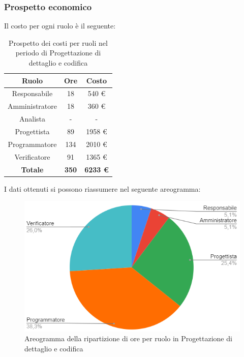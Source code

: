 \subsubsection{Prospetto economico}
Il costo per ogni ruolo è il seguente:
\begin{table}[H]
		\begin{center}
			\setlength{\aboverulesep}{0pt}
			\setlength{\belowrulesep}{0pt}
			\setlength{\extrarowheight}{.75ex}
			\begin{tabular}{ c c c }
				\rowcolor{AzzurroGruppo!30} 
				\textbf{Ruolo} & \textbf{Ore} & \textbf{Costo}  \\
				\toprule
				Responsabile   & 18 & 540 \euro \\
				Amministratore & 18 & 360 \euro \\
				Analista       & - & - \\
				Progettista    & 89 & 1958 \euro \\
				Programmatore  & 134 & 2010 \euro \\
				Verificatore   & 91 & 1365 \euro \\
				\textbf{Totale} & \textbf{350} & \textbf{6233 \euro} \\
				\bottomrule
			\end{tabular}
			\caption{ Prospetto dei costi per ruoli nel periodo di Progettazione di dettaglio e codifica}
		\end{center}
	\end{table}
I dati ottenuti si possono riassumere nel seguente areogramma:
\begin{figure}[H]
    \centering
    \includegraphics[scale = 0.5]{components/img/dettaglio_torta.png}
    \caption{ Areogramma della ripartizione di ore per ruolo in Progettazione di dettaglio e codifica}
    \label{fig:Areogramma ripartizione ore , fase di Progettazione di dettaglio e codifica}
\end{figure}

